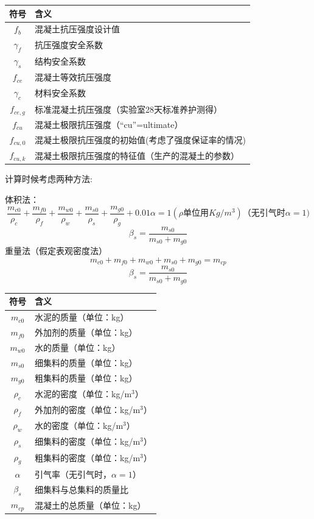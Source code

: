 \documentclass[12pt, a4paper, oneside, UTF8]{ctexbook}
\begin{document}
\begin{tabular}{|c|p{10cm}|}
\hline
\textbf{符号} & \textbf{含义} \\ 
\hline
$f_b$ & 混凝土抗压强度设计值 \\ 
\hline
$\gamma_f$ & 抗压强度安全系数 \\ 
\hline
$\gamma_s$ & 结构安全系数 \\ 
\hline
$f_{ce}$ & 混凝土等效抗压强度 \\ 
\hline
$\gamma_c$ & 材料安全系数 \\ 
\hline
$f_{ce,g}$ & 标准混凝土抗压强度（实验室28天标准养护测得） \\ 
\hline
$f_{cu}$ & 混凝土极限抗压强度（“cu”=ultimate） \\ 
\hline
$f_{cu,0}$ & 混凝土极限抗压强度的初始值(考虑了强度保证率的情况) \\ 
\hline
$f_{cu,k}$ & 混凝土极限抗压强度的特征值（生产的混凝土的参数） \\ 
\hline
\end{tabular}

计算时候考虑两种方法:

体积法：
\[
\frac{m_{c0}}{\rho_c} + \frac{m_{f0}}{\rho_f} + \frac{m_{w0}}{\rho_w} + \frac{m_{s0}}{\rho_s} + \frac{m_{g0}}{\rho_g} + 0.01\alpha = 1 (\rho \text{单位用} Kg/m^3) \text{（无引气时} \alpha = 1)
\]
\[
\beta_s = \frac{m_{s0}}{m_{s0} + m_{g0}}
\]
重量法（假定表观密度法）
\[
m_{c0} + m_{f0} + m_{w0} + m_{s0} + m_{g0} = m_{cp}
\]
\[
\beta_s = \frac{m_{s0}}{m_{s0} + m_{g0}}
\]

\begin{tabular}{|c|p{10cm}|}
\hline
\textbf{符号} & \textbf{含义} \\ 
\hline
$m_{c0}$ & 水泥的质量（单位：kg） \\ 
\hline
$m_{f0}$ & 外加剂的质量（单位：kg） \\ 
\hline
$m_{w0}$ & 水的质量（单位：kg） \\ 
\hline
$m_{s0}$ & 细集料的质量（单位：kg） \\ 
\hline
$m_{g0}$ & 粗集料的质量（单位：kg） \\ 
\hline
$\rho_c$ & 水泥的密度（单位：kg/m\(^3\)） \\ 
\hline
$\rho_f$ & 外加剂的密度（单位：kg/m\(^3\)） \\ 
\hline
$\rho_w$ & 水的密度（单位：kg/m\(^3\)） \\ 
\hline
$\rho_s$ & 细集料的密度（单位：kg/m\(^3\)） \\ 
\hline
$\rho_g$ & 粗集料的密度（单位：kg/m\(^3\)） \\ 
\hline
$\alpha$ & 引气率（无引气时，$\alpha = 1$） \\ 
\hline
$\beta_s$ & 细集料与总集料的质量比 \\ 
\hline
$m_{cp}$ & 混凝土的总质量（单位：kg） \\ 
\hline
\end{tabular}
\end{document}

